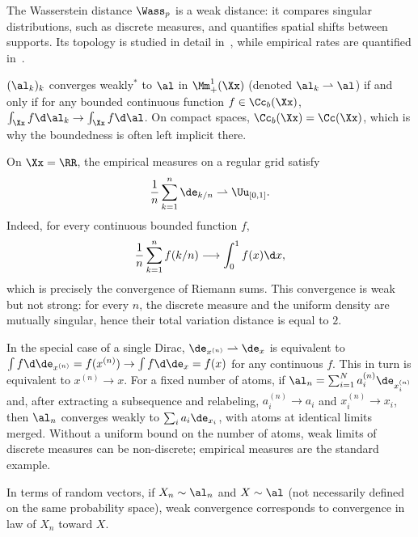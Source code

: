 The Wasserstein distance $\Wass_p$ is a weak distance: it compares singular distributions, such as discrete measures, and quantifies spatial shifts between supports. Its topology is studied in detail in~\cite{Villani09,SantambrogioBook,gigli2011user}, while empirical rates are quantified in~\cite{dudley1969speed,fournier2015rate,weed2017sharp,boissard2015distribution,bolley2007quantitative}.

\begin{defn}\label{dfn-weak-conv}
	$(\al_k)_k$ converges weakly$^*$ to $\al$ in $\Mm_+^1(\Xx)$ (denoted $\al_k \rightharpoonup \al$) if and only if for any bounded continuous function $f \in \Cc_b(\Xx)$, $\int_\Xx f \d\al_k \rightarrow \int_\Xx f \d\al$. On compact spaces, $\Cc_b(\Xx)=\Cc(\Xx)$, which is why the boundedness is often left implicit there.
\end{defn}

\begin{rem}\label{rem-riemann-weak-limit}
	On $\Xx=\RR$, the empirical measures on a regular grid satisfy
	\[
		\frac{1}{n} \sum_{k=1}^n \de_{k/n} \rightharpoonup \Uu_{[0,1]}.
	\]
	Indeed, for every continuous bounded function $f$,
	\[
		\frac{1}{n} \sum_{k=1}^n f(k/n) \longrightarrow \int_0^1 f(x) \d x,
	\]
	which is precisely the convergence of Riemann sums. This convergence is weak but not strong: for every $n$, the discrete measure and the uniform density are mutually singular, hence their total variation distance is equal to $2$.
\end{rem}

\begin{rem}\label{rem-weak-conv-disc}
	In the special case of a single Dirac, $\de_{x^{(n)}} \rightharpoonup \de_x$ is equivalent to $\int f \d\de_{x^{(n)}} = f(x^{(n)}) \rightarrow \int f \d\de_{x} = f(x)$ for any continuous $f$. This in turn is equivalent to $x^{(n)} \rightarrow x$.
	For a fixed number of atoms, if $\al_n=\sum_{i=1}^N a_i^{(n)}\de_{x_i^{(n)}}$ and, after extracting a subsequence and relabeling, $a_i^{(n)}\to a_i$ and $x_i^{(n)}\to x_i$, then $\al_n$ converges weakly to $\sum_i a_i\de_{x_i}$, with atoms at identical limits merged. Without a uniform bound on the number of atoms, weak limits of discrete measures can be non-discrete; empirical measures are the standard example.
\end{rem}

In terms of random vectors, if $X_n \sim \al_n$ and $X \sim \al$ (not necessarily defined on the same probability space), weak convergence corresponds to convergence in law of $X_n$ toward $X$.

